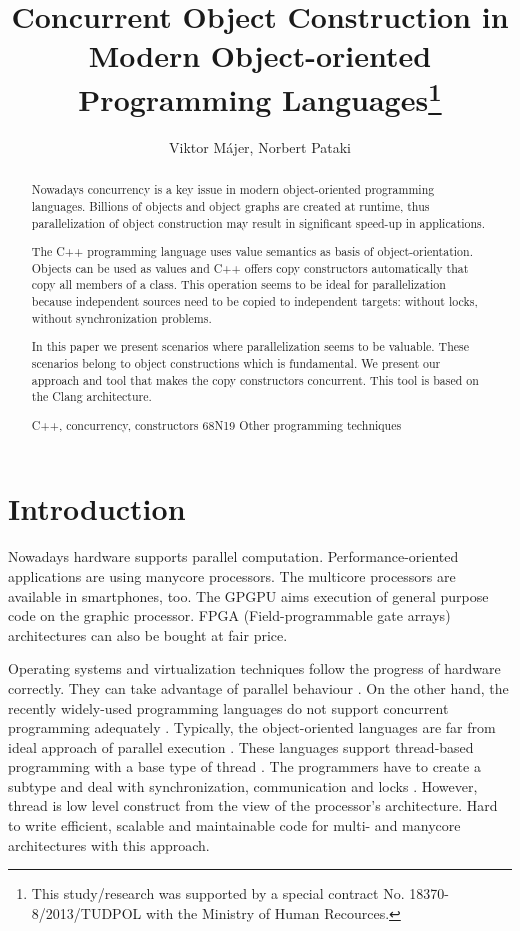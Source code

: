 \documentclass{article}
\title{Concurrent Object Construction in Modern Object-oriented Programming
Languages\thanks{This study/research was supported by a special contract No. 18370-8/2013/TUDPOL with the Ministry of Human Recources.}}
\author{Viktor M\'ajer\inst1, Norbert Pataki\inst2}
\institute{\inst1EPAM System European Headquarters, Budapest\\\url{Viktor_Majer@epam.com}\\
           \inst2Dept. of Programming Languages and Compilers, \\ 
Fac. of Informatics, E\"otv\"os Lor\'and University, Budapest\\\url{patakino@elte.hu}}
\begin{document}
\maketitle

\begin{abstract}
Nowadays concurrency is a key issue in modern object-oriented programming
languages. Billions of objects and object graphs are created at runtime,
thus parallelization of object construction may result in significant
speed-up in applications.

The C++ programming language uses value semantics as basis of
object-orientation. Objects can be used as values and C++ offers copy
constructors automatically that copy all members of a class. This operation
seems to be ideal for parallelization because independent sources need to be
copied to independent targets: without locks, without synchronization problems.

In this paper we present scenarios where parallelization seems to
be valuable. These scenarios belong to object constructions which is fundamental. 
We present our approach and tool that makes the copy constructors concurrent.
This tool is based on the Clang architecture.

\keywords C++, concurrency, constructors
\AMSclassificationnumber 68N19 Other programming techniques
\end{abstract}

\section{Introduction}

Nowadays hardware supports parallel computation. Performance-oriented applications are using
manycore processors. The multicore processors are available in smartphones, too. The GPGPU
aims execution of general purpose code on the graphic processor. FPGA (Field-programmable
gate  arrays) architectures can also be bought at fair price.

Operating systems and virtualization techniques follow the progress of hardware correctly. 
They can take advantage of parallel behaviour \cite{barham:virtualization}. On the other
hand, the recently widely-used programming languages do not support concurrent programming
adequately \cite{lupin:highlevel}. Typically, the object-oriented languages are far from
ideal approach of parallel execution \cite{tripathi:sina}. These languages support
thread-based programming with a base type of thread \cite{oaks:thread}. The programmers have
to create a subtype and deal with synchronization, communication and locks \cite{hughes:thread}.
However, thread is low level construct from the view of the processor's architecture. Hard to
write efficient, scalable and maintainable code for multi- and manycore  architectures with
this approach.
\end{document}
